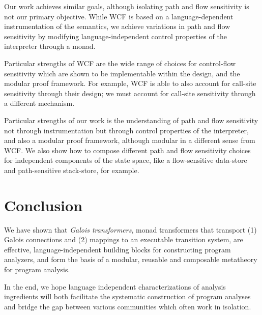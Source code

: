 \par

Our work achieves similar goals, although isolating path and flow
sensitivity is not our primary objective. While WCF is based on a
language-dependent instrumentation of the semantics, we achieve
variations in path and flow sensitivity by modifying
language-independent control properties of the interpreter through a
monad.

\par

Particular strengths of WCF are the wide range of choices for
control-flow sensitivity which are shown to be implementable within the
design, and the modular proof framework. For example, WCF is able to
also account for call-site sensitivity through their design; we must
account for call-site sensitivity through a different mechanism.

\par

Particular strengths of our work is the understanding of path and flow
sensitivity not through instrumentation but through control properties
of the interpreter, and also a modular proof framework, although modular
in a different sense from WCF. We also show how to compose different
path and flow sensitivity choices for independent components of the
state space, like a flow-sensitive data-store and path-sensitive
stack-store, for example.

\par

\section{Conclusion}\label{conclusion}

\par

We have shown that \emph{Galois transformers}, monad transformers that
transport (1) Galois connections and (2) mappings to an executable
transition system, are effective, language-independent building blocks
for constructing program analyzers, and form the basis of a modular,
reusable and composable metatheory for program analysis.

\par

In the end, we hope language independent characterizations of analysis
ingredients will both facilitate the systematic construction of program
analyses and bridge the gap between various communities which often work
in isolation.
